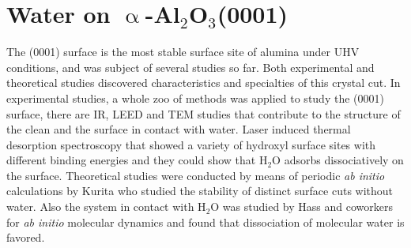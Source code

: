 \documentclass[11pt,DIV=13,BCOR=5mm,a4paper,headinclude]{scrbook}
\begin{document}
% 


\chapter{Water on $\upalpha$-Al$_2$O$_3$(0001)}\label{sec:0001}
The (0001) surface is the most stable surface site of alumina under UHV conditions, and was subject of several studies so far\cite{kuri10,hass98,hass00,Elam1998,Brown1999,Kelber2007}.
Both experimental and theoretical studies discovered characteristics and specialties of this crystal cut.
In experimental studies, a whole zoo of methods was applied to study the (0001) surface, there are IR\cite{Tsyganenko1996}, LEED\cite{Chang1971} and TEM\cite{Lee1985} studies that contribute to the structure of the clean and the surface in contact with water.
Laser induced thermal desorption spectroscopy\cite{Elam1998,Nelson1998} that showed a variety of hydroxyl surface sites with different binding energies and they could show that H$_2$O adsorbs dissociatively on the surface.
Theoretical studies were conducted by means of periodic \textit{ab initio} calculations by Kurita\cite{kuri10} who studied the stability of distinct surface cuts without water. Also the system in contact with H$_2$O was studied by Hass and coworkers\cite{hass98,hass00} for \textit{ab initio} molecular dynamics and found that dissociation of molecular water is favored.
\\
\end{document}
